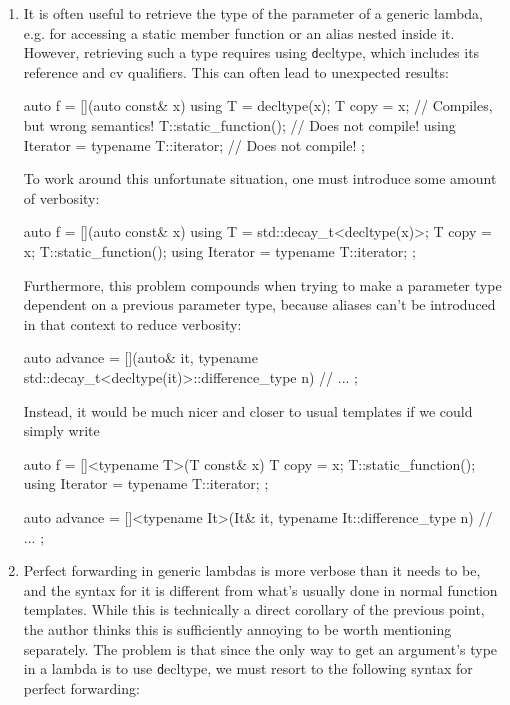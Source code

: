 \documentclass[11pt]{article}
\newcommand{\cc}[1]{\texttt{#1}}
\begin{document}
\begin{enumerate}
\item
It is often useful to retrieve the type of the parameter of a generic
lambda, e.g. for accessing a static member function or an alias nested
inside it. However, retrieving such a type requires using \cc decltype,
which includes its reference and cv qualifiers. This can often lead to
unexpected results:

\begin{cpp}
auto f = [](auto const& x) {
  using T = decltype(x);
  T copy = x;                             // Compiles, but wrong semantics!
  T::static_function();                   // Does not compile!
  using Iterator = typename T::iterator;  // Does not compile!
};
\end{cpp}

To work around this unfortunate situation, one must introduce some
amount of verbosity:

\begin{cpp}
auto f = [](auto const& x) {
  using T = std::decay_t<decltype(x)>;
  T copy = x;
  T::static_function();
  using Iterator = typename T::iterator;
};
\end{cpp}

Furthermore, this problem compounds when trying to make a parameter type
dependent on a previous parameter type, because aliases can't be introduced
in that context to reduce verbosity:

\begin{cpp}
auto advance = [](auto& it,
                  typename std::decay_t<decltype(it)>::difference_type n) {
  // ...
};
\end{cpp}

Instead, it would be much nicer and closer to usual templates if we could
simply write

\begin{cpp}
auto f = []<typename T>(T const& x) {
  T copy = x;
  T::static_function();
  using Iterator = typename T::iterator;
};

auto advance = []<typename It>(It& it, typename It::difference_type n) {
  // ...
};
\end{cpp}


\item
Perfect forwarding in generic lambdas is more verbose than it needs to
be, and the syntax for it is different from what's usually done in normal
function templates. While this is technically a direct corollary of the
previous point, the author thinks this is sufficiently annoying to be
worth mentioning separately. The problem is that since the only way to
get an argument's type in a lambda is to use \cc decltype, we must resort
to the following syntax for perfect forwarding:


\end{enumerate}
\end{document}
